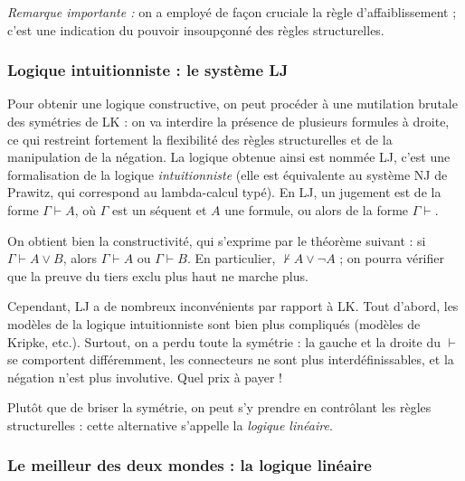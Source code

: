 \documentclass[a4paper, 11pt]{article}
\begin{document}
\emph{Remarque importante :} on a employé de façon cruciale la règle d'affaiblissement ; c'est une indication du pouvoir insoupçonné des règles structurelles.

\subsubsection{Logique intuitionniste : le système LJ}

Pour obtenir une logique constructive, on peut procéder à une mutilation brutale des symétries de LK : on va interdire la présence de plusieurs formules à droite, ce qui restreint fortement la flexibilité des règles structurelles et de la manipulation de la négation. La logique obtenue ainsi est nommée LJ, c'est une formalisation de la logique \emph{intuitionniste} (elle est équivalente au système NJ de Prawitz, qui correspond au lambda-calcul typé). En LJ, un jugement est de la forme $\Gamma \vdash A$, où $\Gamma$ est un séquent et $A$ une formule, ou alors de la forme $\Gamma \vdash$.

On obtient bien la constructivité, qui s'exprime par le théorème suivant : si $\Gamma \vdash A \lor B$, alors $\Gamma \vdash A$ ou $\Gamma \vdash B$. En particulier, $\not\vdash A \lor \neg A$ ; on pourra vérifier que la preuve du tiers exclu plus haut ne marche plus.

Cependant, LJ a de nombreux inconvénients par rapport à LK. Tout d'abord, les modèles de la logique intuitionniste sont bien plus compliqués (modèles de Kripke, etc.). Surtout, on a perdu toute la symétrie : la gauche et la droite du $\vdash$ se comportent différemment, les connecteurs ne sont plus interdéfinissables, et la négation n'est plus involutive. Quel prix à payer !

Plutôt que de briser la symétrie, on peut s'y prendre en contrôlant les règles structurelles : cette alternative s'appelle la \emph{logique linéaire}.

\subsubsection{Le meilleur des deux mondes : la logique linéaire}
\end{document}
